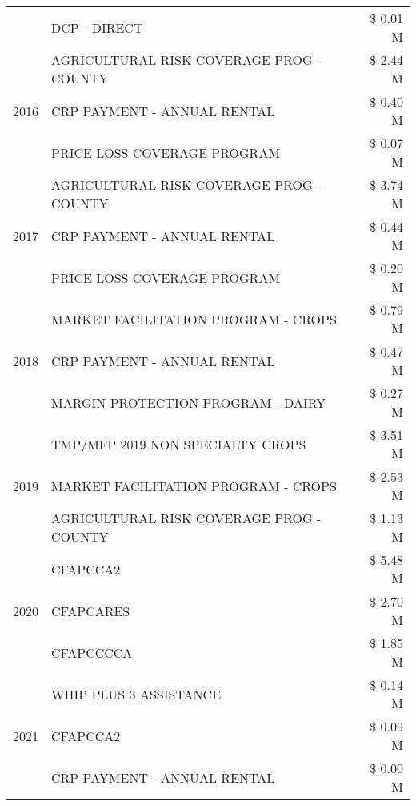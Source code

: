 \begin{tabular}{llr}
 & DCP - DIRECT & \$ 0.01 M \\
\cline{1-3}
\multirow[t]{3}{*}{2016} & AGRICULTURAL RISK COVERAGE PROG - COUNTY & \$ 2.44 M \\
 & CRP PAYMENT - ANNUAL RENTAL & \$ 0.40 M \\
 & PRICE LOSS COVERAGE PROGRAM & \$ 0.07 M \\
\cline{1-3}
\multirow[t]{3}{*}{2017} & AGRICULTURAL RISK COVERAGE PROG - COUNTY & \$ 3.74 M \\
 & CRP PAYMENT - ANNUAL RENTAL & \$ 0.44 M \\
 & PRICE LOSS COVERAGE PROGRAM & \$ 0.20 M \\
\cline{1-3}
\multirow[t]{3}{*}{2018} & MARKET FACILITATION PROGRAM - CROPS & \$ 0.79 M \\
 & CRP PAYMENT - ANNUAL RENTAL & \$ 0.47 M \\
 & MARGIN PROTECTION PROGRAM - DAIRY & \$ 0.27 M \\
\cline{1-3}
\multirow[t]{3}{*}{2019} & TMP/MFP 2019 NON SPECIALTY CROPS & \$ 3.51 M \\
 & MARKET FACILITATION PROGRAM - CROPS & \$ 2.53 M \\
 & AGRICULTURAL RISK COVERAGE PROG - COUNTY & \$ 1.13 M \\
\cline{1-3}
\multirow[t]{3}{*}{2020} & CFAPCCA2 & \$ 5.48 M \\
 & CFAPCARES & \$ 2.70 M \\
 & CFAPCCCCA & \$ 1.85 M \\
\cline{1-3}
\multirow[t]{3}{*}{2021} & WHIP PLUS 3 ASSISTANCE & \$ 0.14 M \\
 & CFAPCCA2 & \$ 0.09 M \\
 & CRP PAYMENT - ANNUAL RENTAL & \$ 0.00 M \\
\cline{1-3}
\bottomrule
\end{tabular}

